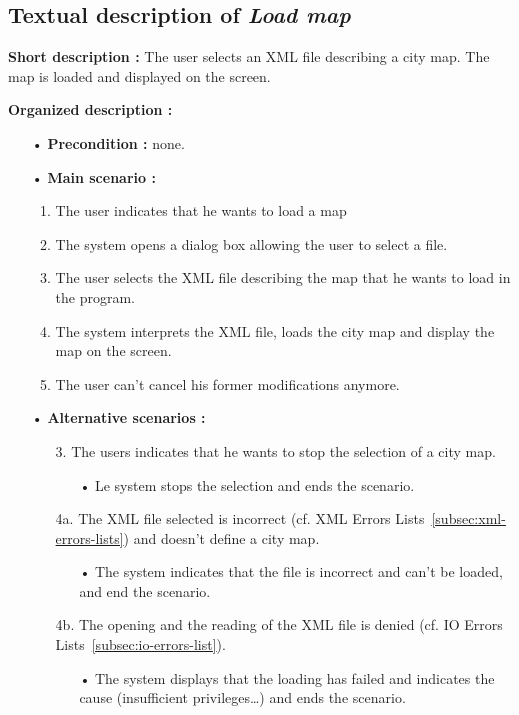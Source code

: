 \documentclass[paper=a4, fontsize=11pt]{report}
\numberwithin{equation}{section}		%
\numberwithin{figure}{section}		%
\numberwithin{table}{section}		%
\renewcommand{\it}[1]{\textit{#1}}
\begin{document}
\subsection{Textual description of \it{Load map}}
\label{subsec:textual-description-of-load-map}

\textbf{Short description :} The user selects an XML file describing a city map. The map is loaded and displayed on the screen.

\textbf{Organized description :}

\begin{itemize}
  \item[•] \textbf{Precondition :} none.
  \item[•] \textbf{Main scenario :}
  \begin{enumerate}
    \item The user indicates that he wants to load a map
    \item The system opens a dialog box allowing the user to select a file.
    \item The user selects the XML file describing the map that he wants to load in the program.
    \item The system interprets the XML file, loads the city map and display the map on the screen.
    \item The user can’t cancel his former modifications anymore.
  \end{enumerate}
  \item[•] \textbf{Alternative scenarios :}
  \begin{itemize}
    \item[3.] The users indicates that he wants to stop the selection of a city map.
    \begin{itemize}
      \item[•] Le system stops the selection and ends the scenario.
    \end{itemize}
    \item[4a.] The XML file selected is incorrect (cf. XML Errors Lists~\ref{subsec:xml-errors-lists}) and doesn’t define a city map.
    \begin{itemize}
      \item[•] The system indicates that the file is incorrect and can’t be loaded, and end the scenario.
    \end{itemize}
    \item[4b.] The opening and the reading of the XML file is denied (cf. IO Errors Lists~\ref{subsec:io-errors-list}).
    \begin{itemize}
      \item[•] The system displays that the loading has failed and indicates the cause (insufficient privileges…) and ends the scenario.
    \end{itemize}
  \end{itemize}
\end{itemize}
\end{document}
